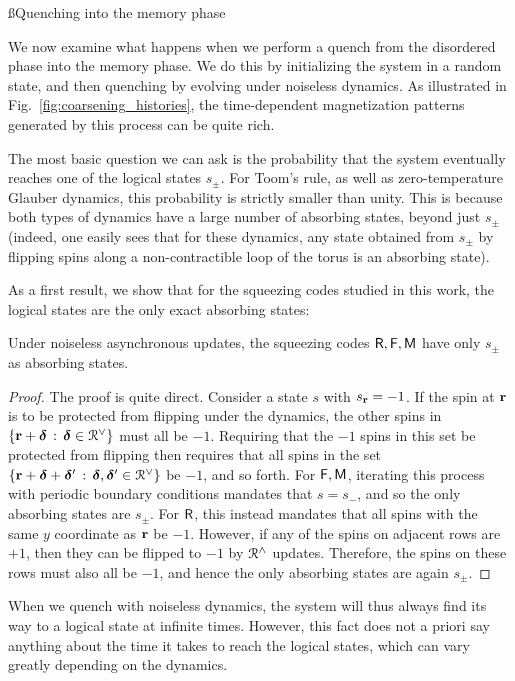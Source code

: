 \documentclass[pra,aps,twocolumn,groupedaddress,superscriptaddress,nofootinbib,preprintnumbers]{revtex4-2}
\begin{document}
	
	
	\ss{Quenching into the memory phase} \label{ss:inftquench}
	
	We now examine what happens when we perform a quench from the disordered phase into the memory phase. We do this by initializing the system in a random state, and then quenching by evolving under noiseless dynamics. As illustrated in Fig.~\ref{fig:coarsening_histories}, the time-dependent magnetization patterns generated by this process can be quite rich. 
	
	The most basic question we can ask is the probability that the system eventually reaches one of the logical states $s_\pm$. For Toom's rule, as well as zero-temperature Glauber dynamics, this probability is strictly smaller than unity. This is because both types of dynamics have a large number of absorbing states, beyond just $s_\pm$ (indeed, one easily sees that for these dynamics, any state obtained from $s_\pm$ by flipping spins along a non-contractible loop of the torus is an absorbing state). 
	
	As a first result, we show that for the squeezing codes studied in this work, the logical states are the only exact absorbing states: 
	\begin{proposition}
		Under noiseless asynchronous updates, the squeezing codes $\mathsf{R},\mathsf{F},\mathsf{M}$ have only $s_\pm$ as absorbing states. 
	\end{proposition}
	\begin{proof}
		The proof is quite direct. Consider a state $s$ with $s_{\mathbf{r}} =-1$. If the spin at $\mathbf{r}$ is to be protected from flipping under the dynamics, the other spins in $\{\mathbf{r}+{\boldsymbol{\delta}} \, : \, {\boldsymbol{\delta}}\in \mathcal{R}^\vee\}$ must all be $-1$. Requiring that the $-1$ spins in this set be protected from flipping then requires that all spins in the set $\{\mathbf{r} + {\boldsymbol{\delta}} + {\boldsymbol{\delta}}'\, : \, {\boldsymbol{\delta}}, {\boldsymbol{\delta}}' \in \mathcal{R}^\vee\}$ be $-1$, and so forth. For $\mathsf{F},\mathsf{M}$, iterating this process with periodic boundary conditions mandates that $s=s_-$, and so the only absorbing states are $s_\pm$. For $\mathsf{R}$, this instead mandates that all spins with the same $y$ coordinate as $\mathbf{r}$ be $-1$.  However, if any of the spins on adjacent rows are $+1$, then they can be flipped to $-1$ by $\mathcal{R}^\wedge$ updates. Therefore, the spins on these rows must also all be $-1$, and hence the only absorbing states are again $s_\pm$. 
	\end{proof}
	
	When we quench with noiseless dynamics, the system will thus always find its way to a logical state at infinite times. However, this fact does not a priori say anything about the time it takes to reach the logical states, which can vary greatly depending on the dynamics. 
	
\end{document}
